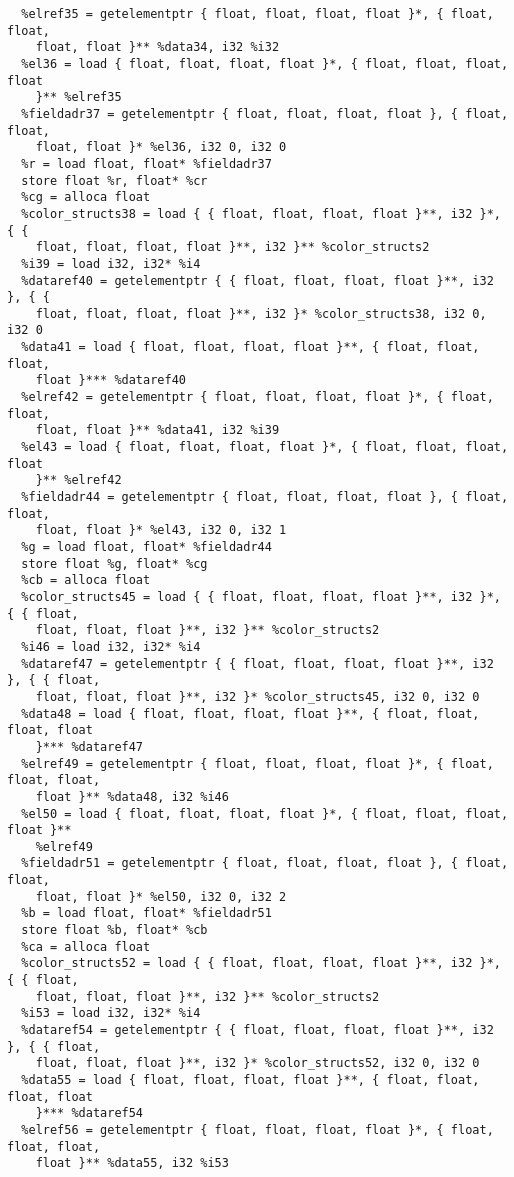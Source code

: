 \documentclass[main.tex]{subfiles}
\begin{document}
{\begin{lstlisting}
  %elref35 = getelementptr { float, float, float, float }*, { float, float, 
    float, float }** %data34, i32 %i32
  %el36 = load { float, float, float, float }*, { float, float, float, float 
    }** %elref35
  %fieldadr37 = getelementptr { float, float, float, float }, { float, float, 
    float, float }* %el36, i32 0, i32 0
  %r = load float, float* %fieldadr37
  store float %r, float* %cr
  %cg = alloca float
  %color_structs38 = load { { float, float, float, float }**, i32 }*, { { 
    float, float, float, float }**, i32 }** %color_structs2
  %i39 = load i32, i32* %i4
  %dataref40 = getelementptr { { float, float, float, float }**, i32 }, { { 
    float, float, float, float }**, i32 }* %color_structs38, i32 0, i32 0
  %data41 = load { float, float, float, float }**, { float, float, float, 
    float }*** %dataref40
  %elref42 = getelementptr { float, float, float, float }*, { float, float,
    float, float }** %data41, i32 %i39
  %el43 = load { float, float, float, float }*, { float, float, float, float 
    }** %elref42
  %fieldadr44 = getelementptr { float, float, float, float }, { float, float,
    float, float }* %el43, i32 0, i32 1
  %g = load float, float* %fieldadr44
  store float %g, float* %cg
  %cb = alloca float
  %color_structs45 = load { { float, float, float, float }**, i32 }*, { { float,
    float, float, float }**, i32 }** %color_structs2
  %i46 = load i32, i32* %i4
  %dataref47 = getelementptr { { float, float, float, float }**, i32 }, { { float,
    float, float, float }**, i32 }* %color_structs45, i32 0, i32 0
  %data48 = load { float, float, float, float }**, { float, float, float, float
    }*** %dataref47
  %elref49 = getelementptr { float, float, float, float }*, { float, float, float,
    float }** %data48, i32 %i46
  %el50 = load { float, float, float, float }*, { float, float, float, float }** 
    %elref49
  %fieldadr51 = getelementptr { float, float, float, float }, { float, float, 
    float, float }* %el50, i32 0, i32 2
  %b = load float, float* %fieldadr51
  store float %b, float* %cb
  %ca = alloca float
  %color_structs52 = load { { float, float, float, float }**, i32 }*, { { float,
    float, float, float }**, i32 }** %color_structs2
  %i53 = load i32, i32* %i4
  %dataref54 = getelementptr { { float, float, float, float }**, i32 }, { { float,
    float, float, float }**, i32 }* %color_structs52, i32 0, i32 0
  %data55 = load { float, float, float, float }**, { float, float, float, float 
    }*** %dataref54
  %elref56 = getelementptr { float, float, float, float }*, { float, float, float, 
    float }** %data55, i32 %i53

\end{lstlisting}}
\end{document}
